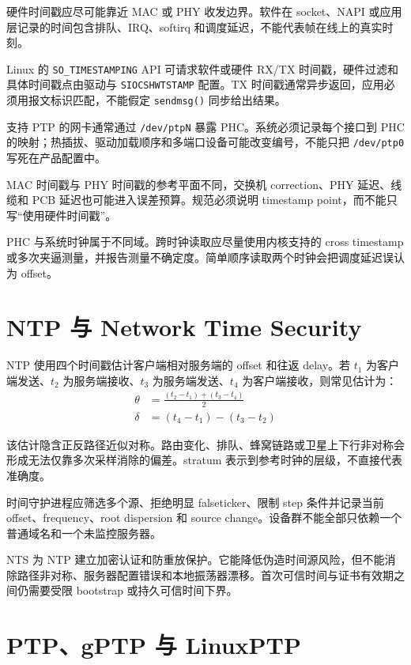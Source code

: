 硬件时间戳应尽可能靠近 MAC 或 PHY 收发边界。软件在 socket、NAPI 或应用层记录的时间包含排队、IRQ、softirq 和调度延迟，不能代表帧在线上的真实时刻。

Linux 的 \texttt{SO\_TIMESTAMPING} API 可请求软件或硬件 RX/TX 时间戳，硬件过滤和具体时间戳点由驱动与 \texttt{SIOCSHWTSTAMP} 配置\cite{linux-timestamping}。TX 时间戳通常异步返回，应用必须用报文标识匹配，不能假定 \texttt{sendmsg()} 同步给出结果。

支持 PTP 的网卡通常通过 \texttt{/dev/ptpN} 暴露 PHC。系统必须记录每个接口到 PHC 的映射；热插拔、驱动加载顺序和多端口设备可能改变编号，不能只把 \texttt{/dev/ptp0} 写死在产品配置中。

MAC 时间戳与 PHY 时间戳的参考平面不同，交换机 correction、PHY 延迟、线缆和 PCB 延迟也可能进入误差预算。规范必须说明 timestamp point，而不能只写“使用硬件时间戳”。

PHC 与系统时钟属于不同域。跨时钟读取应尽量使用内核支持的 cross timestamp 或多次夹逼测量，并报告测量不确定度。简单顺序读取两个时钟会把调度延迟误认为 offset。

\section{NTP 与 Network Time Security}

NTP 使用四个时间戳估计客户端相对服务端的 offset 和往返 delay\cite{rfc5905}。若 $t_1$ 为客户端发送、$t_2$ 为服务端接收、$t_3$ 为服务端发送、$t_4$ 为客户端接收，则常见估计为：
\begin{align}
  \theta &= \frac{(t_2-t_1)+(t_3-t_4)}{2} \\
  \delta &= (t_4-t_1)-(t_3-t_2)
\end{align}

该估计隐含正反路径近似对称。路由变化、排队、蜂窝链路或卫星上下行非对称会形成无法仅靠多次采样消除的偏差。stratum 表示到参考时钟的层级，不直接代表准确度。

时间守护进程应筛选多个源、拒绝明显 falseticker、限制 step 条件并记录当前 offset、frequency、root dispersion 和 source change。设备群不能全部只依赖一个普通域名和一个未监控服务器。

NTS 为 NTP 建立加密认证和防重放保护\cite{rfc8915}。它能降低伪造时间源风险，但不能消除路径非对称、服务器配置错误和本地振荡器漂移。首次可信时间与证书有效期之间仍需要受限 bootstrap 或持久可信时间下界。

\section{PTP、gPTP 与 LinuxPTP}

